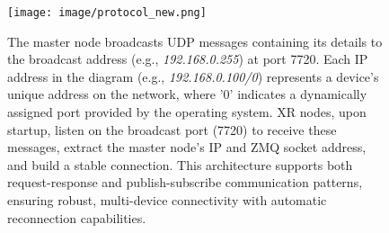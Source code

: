 \begin{figure}[ht]
    \centering
    \texttt{[image: image/protocol\_new.png]}
    \caption{The master node broadcasts UDP messages containing its details to the broadcast address (e.g., \textit{192.168.0.255}) at port 7720. Each IP address in the diagram (e.g., \textit{192.168.0.100/0}) represents a device's unique address on the network, where '0' indicates a dynamically assigned port provided by the operating system. XR nodes, upon startup, listen on the broadcast port (7720) to receive these messages, extract the master node's IP and ZMQ socket address, and build a stable connection. This architecture supports both request-response and publish-subscribe communication patterns, ensuring robust, multi-device connectivity with automatic reconnection capabilities.}
    \label{fig:protocol}
\end{figure}